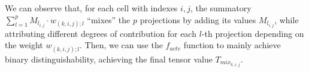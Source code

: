 \noindent We can observe that, for each cell with indexes $i,j$, the summatory $\sum\limits_{l=1}^{p}M_{l_{i,j}} \cdot w_{(k,i,j);l}$ ``mixes'' the $p$ projections by adding its values $M_{l_{i,j}}$, while attributing different degrees of contribution for each $l$-th projection depending on the weight $w_{(k,i,j);l}$. Then, we can use the $f_{actv}$ function to mainly achieve binary distinguishability, achieving the final tensor value $T_{mix_{k,i,j}}$. 


